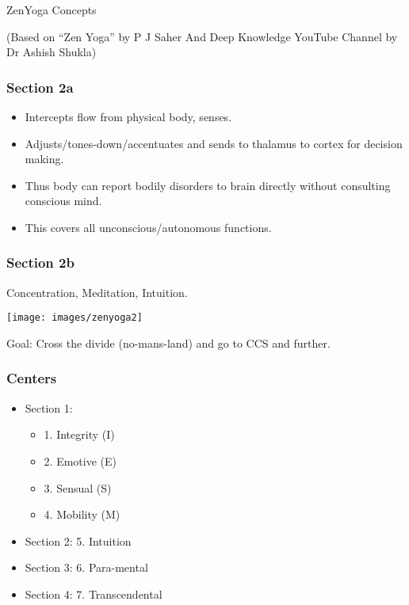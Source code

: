 \begin{frame}[fragile]\frametitle{}
\begin{center}
{\Large ZenYoga Concepts}


{\tiny (Based on ``Zen Yoga'' by P J Saher And Deep Knowledge YouTube Channel by Dr Ashish Shukla)}
\end{center}
\end{frame}

\begin{frame}[fragile]
\frametitle{Section 2a}
\begin{itemize}
\item Intercepts flow from physical body, senses.
\item Adjusts/tones-down/accentuates and sends to thalamus to cortex for decision making.
\item Thus body can report bodily disorders to brain directly without consulting conscious mind.
\item This covers all unconscious/autonomous functions.
\end{itemize}
\end{frame}

\begin{frame}[fragile]
\frametitle{Section 2b}
Concentration, Meditation, Intuition.

 \begin{center}
\texttt{[image: images/zenyoga2]}
\end{center}

Goal: Cross the divide (no-mans-land) and go to CCS and further.

\end{frame}

\begin{frame}[fragile]
\frametitle{Centers}

\begin{itemize}
\item Section 1:
\begin{itemize}
\item 1. Integrity (I)
\item 2. Emotive (E)
\item 3. Sensual (S)
\item 4. Mobility (M)
\end{itemize}
\item Section 2: 5. Intuition
\item Section 3: 6. Para-mental
\item Section 4: 7. Transcendental
\end{itemize}

\end{frame}



